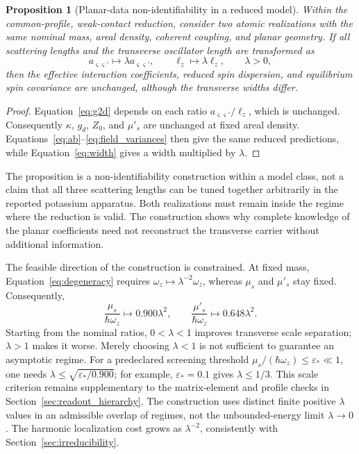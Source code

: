 \documentclass[11pt,a4paper]{article}
\newtheorem{proposition}{Proposition}[section]
\theoremstyle{definition}
\theoremstyle{remark}
\newcommand{\musp}{\mu'_s}
\newcommand{\lop}{\ell_z}
\begin{document}
\begin{proposition}[Planar-data non-identifiability in a reduced model]
Within the common-profile, weak-contact reduction, consider two atomic realizations with the same nominal mass, areal density, coherent coupling, and planar geometry. If all scattering lengths and the transverse oscillator length are transformed as
\begin{equation}
 a_{\varsigma\varsigma'}\longmapsto\lambda a_{\varsigma\varsigma'},
 \qquad \lop\longmapsto\lambda\lop,
 \qquad \lambda>0,
 \label{eq:degeneracy}
\end{equation}
then the effective interaction coefficients, reduced spin dispersion, and equilibrium spin covariance are unchanged, although the transverse widths differ.
\end{proposition}
\begin{proof}
Equation~\eqref{eq:g2d} depends on each ratio $a_{\varsigma\varsigma'}/\lop$, which is unchanged. Consequently $\kappa$, $g_d$, $Z_0$, and $\musp$ are unchanged at fixed areal density. Equations~\eqref{eq:ab}--\eqref{eq:field_variances} then give the same reduced predictions, while Equation~\eqref{eq:width} gives a width multiplied by $\lambda$.
\end{proof}

The proposition is a non-identifiability construction within a model class, not a claim that all three scattering lengths can be tuned together arbitrarily in the reported potassium apparatus. Both realizations must remain inside the regime where the reduction is valid. The construction shows why complete knowledge of the planar coefficients need not reconstruct the transverse carrier without additional information.

The feasible direction of the construction is constrained. At fixed mass, Equation~\eqref{eq:degeneracy} requires $\omega_z\mapsto\lambda^{-2}\omega_z$, whereas $\mu_s$ and $\musp$ stay fixed. Consequently,
\begin{equation}
 \frac{\mu_s}{\hbar\omega_z}\longmapsto0.900\lambda^2,
 \qquad
 \frac{\musp}{\hbar\omega_z}\longmapsto0.648\lambda^2.
 \label{eq:lambda_validity}
\end{equation}
Starting from the nominal ratios, $0<\lambda<1$ improves transverse scale separation; $\lambda>1$ makes it worse. Merely choosing $\lambda<1$ is not sufficient to guarantee an asymptotic regime. For a predeclared screening threshold $\mu_s/(\hbar\omega_z)\leq\varepsilon_*\ll1$, one needs $\lambda\leq\sqrt{\varepsilon_*/0.900}$; for example, $\varepsilon_*=0.1$ gives $\lambda\leq1/3$. This scale criterion remains supplementary to the matrix-element and profile checks in Section~\ref{sec:readout_hierarchy}. The construction uses distinct finite positive $\lambda$ values in an admissible overlap of regimes, not the unbounded-energy limit $\lambda\to0$. The harmonic localization cost grows as $\lambda^{-2}$, consistently with Section~\ref{sec:irreducibility}.
\end{document}
